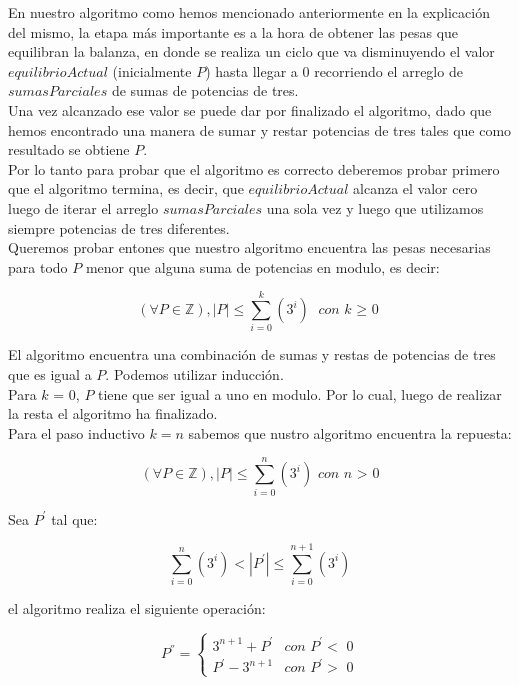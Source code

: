 En nuestro algoritmo como hemos mencionado anteriormente en la explicaci\'on del mismo, la etapa m\'as importante es a la hora de obtener las pesas que equilibran la balanza, en donde se realiza un ciclo que va disminuyendo el valor $equilibrioActual$ (inicialmente $P$) hasta llegar a 0 recorriendo el arreglo de $sumasParciales$ de sumas de potencias de tres.\\
Una vez alcanzado ese valor se puede dar por finalizado el algoritmo, dado que hemos encontrado una manera de sumar y restar potencias de tres tales que como resultado se obtiene $P$.\\

Por lo tanto para probar que el algoritmo es correcto deberemos probar primero que el algoritmo termina, es decir, que $equilibrioActual$ alcanza el valor cero luego de iterar el arreglo $sumasParciales$ una sola vez y luego que utilizamos siempre potencias de tres diferentes.\\

Queremos probar entones que nuestro algoritmo encuentra las pesas necesarias para todo $P$ menor que alguna suma de potencias en modulo, es decir:

\begin{equation}
(\forall P \in \mathbb{Z}), |P| \leq \sum_{i=0}^{k}(3^i) \textit{ con k $\geq$ 0}
\end{equation}

El algoritmo encuentra una combinación de sumas y restas de potencias de tres que es igual a $P$. Podemos utilizar inducción.\\

Para $k$ = 0, $P$ tiene que ser igual a uno en modulo. Por lo cual, luego de realizar la resta el algoritmo ha finalizado.\\

Para el paso inductivo $k = n$ sabemos que nustro algoritmo encuentra la repuesta:

\begin{equation}
(\forall P \in \mathbb{Z}), |P| \leq \sum_{i=0}^{n}(3^i) \textit{ con n > 0}
\end{equation}

Sea $P^{'}$  tal que: 

\begin{equation}
\sum_{i=0}^{n}(3^i) <  |P^{'}| \leq \sum_{i=0}^{n+1}(3^i) 
\end{equation}

el algoritmo realiza el siguiente operación:

\begin{equation}
P^{''} = \left\{ \begin{array}{lcc}
             3^{n+1} + P^{'} & \textit{con $P^{'} <$ 0} \\
              P^{'} - 3^{n+1} & \textit{con $P^{'} >$ 0} 
             \end{array}
             \right.
\end{equation} 

